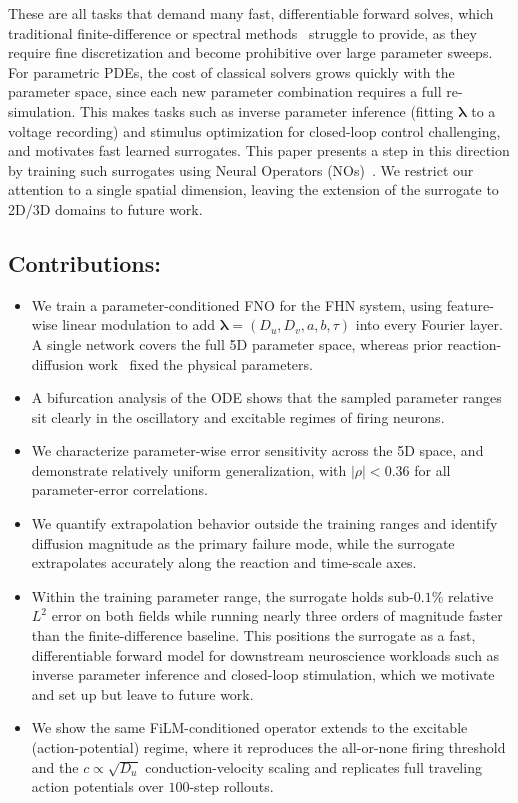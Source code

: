 \documentclass[runningheads]{llncs}
\begin{document}
These are all tasks that demand many fast, differentiable forward solves, which traditional finite-difference or spectral methods~\cite{Ermentrout2010,2020PhRvR...2b3068B} struggle to provide, as they require fine discretization and become prohibitive over large parameter sweeps. For parametric PDEs, the cost of classical solvers grows quickly with the parameter space, since each new parameter combination requires a full re-simulation. This makes tasks such as inverse parameter inference (fitting $\bm{\lambda}$ to a voltage recording) and stimulus optimization for closed-loop control challenging, and motivates fast learned surrogates. This paper presents a step in this direction by training such surrogates using Neural Operators (NOs)~\cite{kovachki2021neural}. We restrict our attention to a single spatial dimension, leaving the extension of the surrogate to 2D/3D domains to future work.

\subsection*{Contributions:}
\begin{itemize}
    \item We train a parameter-conditioned FNO for the FHN system, using feature-wise linear modulation to add $\bm{\lambda} = (D_u, D_v, a, b, \tau)$ into every Fourier layer. A single network covers the full 5D parameter space, whereas prior reaction-diffusion work~\cite{hao2024fourier} fixed the physical parameters.
    \item A bifurcation analysis of the ODE shows that the sampled parameter ranges sit clearly in the oscillatory and excitable regimes of firing neurons.
    \item We characterize parameter-wise error sensitivity across the 5D space, and demonstrate relatively uniform generalization, with $|\rho| < 0.36$ for all parameter-error correlations.
    \item We quantify extrapolation behavior outside the training ranges and identify diffusion magnitude as the primary failure mode, while the surrogate extrapolates accurately along the reaction and time-scale axes.
    \item Within the training parameter range, the surrogate holds sub-$0.1\%$ relative $L^2$ error on both fields while running nearly three orders of magnitude faster than the finite-difference baseline. This positions the surrogate as a fast, differentiable forward model for downstream neuroscience workloads such as inverse parameter inference and closed-loop stimulation, which we motivate and set up but leave to future work.
    \item We show the same FiLM-conditioned operator extends to the excitable (action-potential) regime, where it reproduces the all-or-none firing threshold and the $c \propto \sqrt{D_u}$ conduction-velocity scaling and replicates full traveling action potentials over $100$-step rollouts.
\end{itemize}
\end{document}
